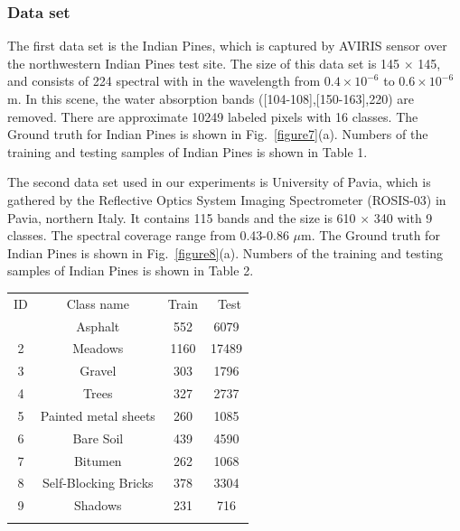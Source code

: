\documentclass{ws-ijwmip}
\begin{document}
\subsubsection{Data set}
\begin{itemlist}
 \item The first data set is the Indian Pines, which is captured by AVIRIS sensor over the northwestern Indian Pines test site. The size of this data set is 145 $\times$ 145, and consists of 224 spectral with in the wavelength from $0.4 \times 10^{-6}$ to $0.6 \times 10^{-6}$m. In this scene, the water absorption bands ([104-108],[150-163],220) are removed. There are approximate 10249 labeled pixels with 16 classes. The Ground truth for Indian Pines is shown in Fig.~\ref{figure7}(a). Numbers of the training and testing samples of Indian Pines is shown in Table 1.
 \item The second data set used in our experiments is University of Pavia, which is gathered by the Reflective Optics System Imaging Spectrometer (ROSIS-03) in Pavia, northern Italy. It contains 115 bands and the size is 610 $\times$ 340 with 9 classes. The  spectral coverage range from 0.43-0.86 $\mu$m. The Ground truth for Indian Pines is shown in Fig.~\ref{figure8}(a). Numbers of the training and testing samples of Indian Pines is shown in Table 2.

\end{itemlist}
\begin{table}[ht]
{\begin{tabular}{@{}cccc@{}} \toprule
ID & Class name & Train &\ Test \\
  \colrule
 1 & Asphalt & 552 & 6079 \\
             2 & Meadows	& 1160 & 17489 \\
             3 & Gravel	& 303 & 1796 \\
             4 & Trees & 327 & 2737 \\
             5 & Painted metal sheets	 & 260 & 1085 \\
             6 & Bare Soil	 & 439 & 4590 \\
             7 & Bitumen	 & 262 & 1068 \\
             8 & Self-Blocking Bricks	 & 378 & 3304 \\
             9 & Shadows & 231 & 716  \\ \botrule
\end{tabular}}
\label{table2}
\end{table}
\end{document}
